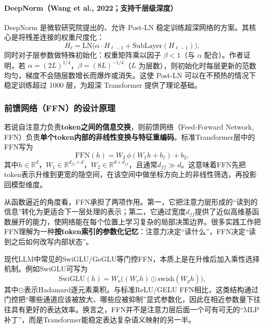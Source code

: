 \documentclass[12pt,a4paper]{article}
\begin{document}
\paragraph{DeepNorm（Wang et al., 2022；支持千层级深度）}

DeepNorm 是微软研究院提出的、允许 Post-LN 稳定训练超深网络的方案。其核心是将残差连接的权重尺度化：
\begin{equation}
H_\ell = \mathrm{LN}\!\bigl(\alpha \cdot H_{\ell-1} + \mathrm{SubLayer}(H_{\ell-1})\bigr),
\end{equation}
同时对子层参数做特殊初始化：权重矩阵乘以因子 $\beta < 1$（与 $\alpha$ 配合）。作者证明，若 $\alpha = (2L)^{1/4}$，$\beta = (8L)^{-1/4}$（$L$ 为层数），则初始化时每层更新的范数均匀，梯度不会随层数增长而爆炸或消失。这使 Post-LN 可以在不预热的情况下稳定训练超过 1000 层，为超深 Transformer 提供了理论基础。

\subsubsection{前馈网络（FFN）的设计原理}

若说自注意力负责\textbf{token之间的信息交换}，则前馈网络（Feed-Forward Network, FFN）负责\textbf{单个token内部的非线性变换与特征重编码}。标准Transformer层中的FFN写为
\begin{equation}
\text{FFN}(h) = W_2 \,\phi(W_1 h + b_1) + b_2,
\end{equation}
其中$h \in \mathbb{R}^{d}$，$W_1 \in \mathbb{R}^{d_{ff} \times d}$，$W_2 \in \mathbb{R}^{d \times d_{ff}}$，且通常$d_{ff} \gg d$。这意味着FFN先把token表示升维到更宽的隐空间，在该空间中做坐标方向上的非线性筛选，再投影回模型维度。

从函数逼近的角度看，FFN承担了两项作用。第一，它把注意力层形成的“读到的信息”转化为更适合下一层处理的表示；第二，它通过宽度$d_{ff}$提供了近似高维基函数展开的能力，使网络能在每个位置上学习复杂的局部决策边界。很多实践工作把FFN理解为一种\textbf{按token索引的参数化记忆}：注意力决定“读什么”，FFN决定“读到之后如何改写内部状态”。

现代LLM中常见的SwiGLU/GeGLU等门控FFN，本质上是在升维后加入乘性选择机制。例如SwiGLU可写为
\begin{equation}
\text{SwiGLU}(h) = W_o \Big((W_v h) \odot \text{swish}(W_g h)\Big),
\end{equation}
其中$\odot$表示Hadamard逐元素乘积。与标准ReLU/GELU FFN相比，这类结构通过门控把“哪些通道应该被放大、哪些应被抑制”显式参数化，因此在相近参数量下往往具有更好的表达效率。换言之，FFN并不是注意力层后面一个可有可无的“MLP补丁”，而是Transformer能稳定表达复杂语义映射的另一半。
\end{document}
